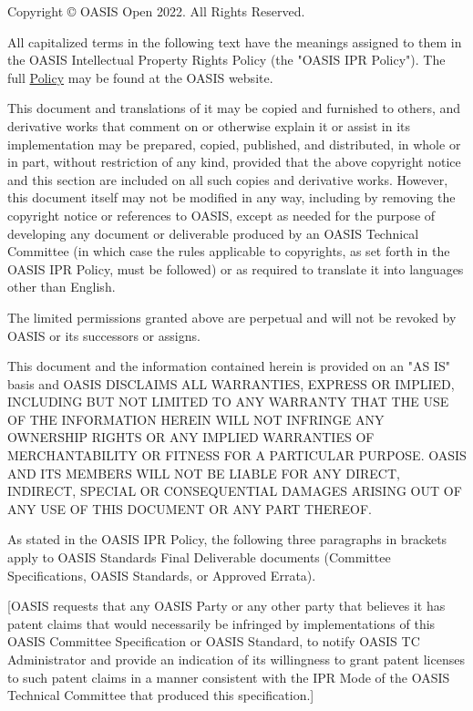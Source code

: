\begin{titlepage}
\vfill\newpage


Copyright © OASIS Open 2022. All Rights Reserved.

All capitalized terms in the following text have the meanings assigned
to them in the OASIS Intellectual Property Rights Policy (the "OASIS
IPR Policy"). The full \href{https://www.oasis-open.org/policies-guidelines/ipr/}{Policy} may be found at the OASIS website.

This document and translations of it may be copied and furnished to
others, and derivative works that comment on or otherwise explain it
or assist in its implementation may be prepared, copied, published,
and distributed, in whole or in part, without restriction of any kind,
provided that the above copyright notice and this section are included
on all such copies and derivative works. However, this document itself
may not be modified in any way, including by removing the copyright
notice or references to OASIS, except as needed for the purpose of
developing any document or deliverable produced by an OASIS Technical
Committee (in which case the rules applicable to copyrights, as set
forth in the OASIS IPR Policy, must be followed) or as required to
translate it into languages other than English.

The limited permissions granted above are perpetual and will not be
revoked by OASIS or its successors or assigns.

This document and the information contained herein is provided on an
"AS IS" basis and OASIS DISCLAIMS ALL WARRANTIES, EXPRESS OR IMPLIED,
INCLUDING BUT NOT LIMITED TO ANY WARRANTY THAT THE USE OF THE
INFORMATION HEREIN WILL NOT INFRINGE ANY OWNERSHIP RIGHTS OR ANY
IMPLIED WARRANTIES OF MERCHANTABILITY OR FITNESS FOR A PARTICULAR
PURPOSE. OASIS AND ITS MEMBERS WILL NOT BE LIABLE FOR ANY DIRECT,
INDIRECT, SPECIAL OR CONSEQUENTIAL DAMAGES ARISING OUT OF ANY USE
OF THIS DOCUMENT OR ANY PART THEREOF.

As stated in the OASIS IPR Policy, the following three paragraphs
in brackets apply to OASIS Standards Final Deliverable documents
(Committee Specifications, OASIS Standards, or Approved Errata).

[OASIS requests that any OASIS Party or any other party that believes
it has patent claims that would necessarily be infringed by
implementations of this OASIS Committee Specification or OASIS
Standard, to notify OASIS TC Administrator and provide an indication
of its willingness to grant patent licenses to such patent claims in a
manner consistent with the IPR Mode of the OASIS Technical Committee
that produced this specification.]


\end{titlepage}
